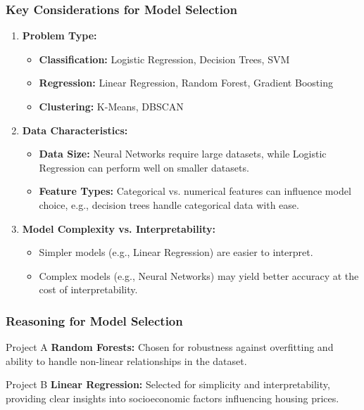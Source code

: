 \documentclass[aspectratio=169]{beamer}
\begin{document}
\begin{frame}[fragile]
    \frametitle{Key Considerations for Model Selection}
    \begin{enumerate}
        \item \textbf{Problem Type:}
        \begin{itemize}
            \item \textbf{Classification:} Logistic Regression, Decision Trees, SVM
            \item \textbf{Regression:} Linear Regression, Random Forest, Gradient Boosting
            \item \textbf{Clustering:} K-Means, DBSCAN
        \end{itemize}
        
        \item \textbf{Data Characteristics:}
        \begin{itemize}
            \item \textbf{Data Size:} Neural Networks require large datasets, while Logistic Regression can perform well on smaller datasets.
            \item \textbf{Feature Types:} Categorical vs. numerical features can influence model choice, e.g., decision trees handle categorical data with ease.
        \end{itemize}
        
        \item \textbf{Model Complexity vs. Interpretability:}
        \begin{itemize}
            \item Simpler models (e.g., Linear Regression) are easier to interpret.
            \item Complex models (e.g., Neural Networks) may yield better accuracy at the cost of interpretability.
        \end{itemize}
    \end{enumerate}
\end{frame}

\begin{frame}[fragile]
    \frametitle{Reasoning for Model Selection}
    \begin{block}{Project A}
        \textbf{Random Forests:} Chosen for robustness against overfitting and ability to handle non-linear relationships in the dataset.
    \end{block}
    
    \begin{block}{Project B}
        \textbf{Linear Regression:} Selected for simplicity and interpretability, providing clear insights into socioeconomic factors influencing housing prices.
    \end{block}
\end{frame}
\end{document}
